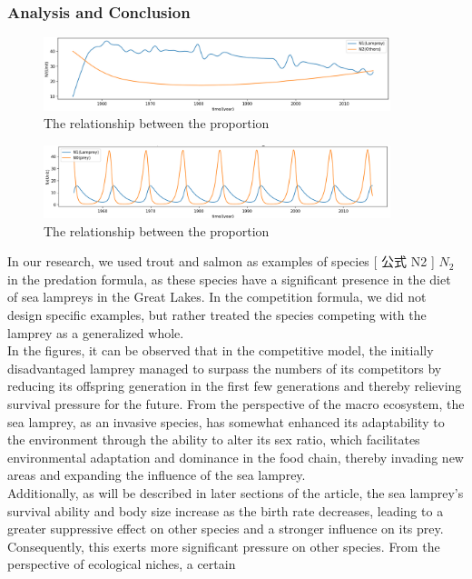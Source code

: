 \documentclass[12pt]{article}
\begin{document}
\subsubsection{Analysis and Conclusion}
\begin{figure}[h]
	\centering
	\includegraphics[width=0.9\textwidth]{Q1_LVComp.png}
	\caption{The relationship between the proportion}
\end{figure}
\begin{figure}[h]
	\centering
	\includegraphics[width=0.9\textwidth]{Q1_LVPP.png}
	\caption{The relationship between the proportion}
\end{figure}
In our research, we used trout and salmon as examples of species [ 公式 N2 ] $N_2$in the predation 
formula, as these species have a significant presence in the diet of sea lampreys in the Great Lakes. 
In the competition formula, we did not design specific examples, but rather treated the species 
competing with the lamprey as a generalized whole. \\
In the figures, it can be observed that in the competitive model, the initially disadvantaged 
lamprey managed to surpass the numbers of its competitors by reducing its offspring generation 
in the first few generations and thereby relieving survival pressure for the future. From the 
perspective of the macro ecosystem, the sea lamprey, as an invasive species, has somewhat 
enhanced its adaptability to the environment through the ability to alter its sex ratio, 
which facilitates environmental adaptation and dominance in the food chain, thereby invading 
new areas and expanding the influence of the sea lamprey. \\
Additionally, as will be described in later sections of the article, the sea lamprey's survival 
ability and body size increase as the birth rate decreases, leading to a greater suppressive 
effect on other species and a stronger influence on its prey. Consequently, this exerts more 
significant pressure on other species. From the perspective of ecological niches, a certain 
\end{document}
